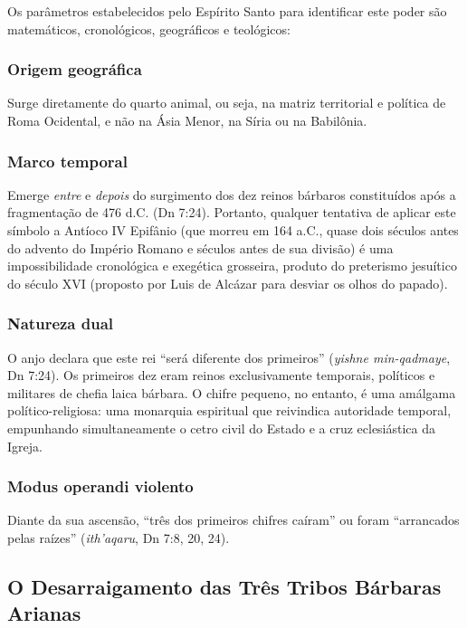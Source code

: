 Os parâmetros estabelecidos pelo Espírito Santo para identificar este poder são matemáticos, cronológicos, geográficos e teológicos:

\subsubsection*{Origem geográfica}
Surge diretamente do quarto animal, ou seja, na matriz territorial e política de Roma Ocidental, e não na Ásia Menor, na Síria ou na Babilônia.

\subsubsection*{Marco temporal}
Emerge \textit{entre} e \textit{depois} do surgimento dos dez reinos bárbaros constituídos após a fragmentação de 476 d.C. (Dn 7:24). Portanto, qualquer tentativa de aplicar este símbolo a Antíoco IV Epifânio (que morreu em 164 a.C., quase dois séculos antes do advento do Império Romano e séculos antes de sua divisão) é uma impossibilidade cronológica e exegética grosseira, produto do preterismo jesuítico do século XVI (proposto por Luis de Alcázar para desviar os olhos do papado).

\subsubsection*{Natureza dual}
O anjo declara que este rei ``será diferente dos primeiros'' (\textit{yishne min-qadmaye}, Dn 7:24). Os primeiros dez eram reinos exclusivamente temporais, políticos e militares de chefia laica bárbara. O chifre pequeno, no entanto, é uma amálgama político-religiosa: uma monarquia espiritual que reivindica autoridade temporal, empunhando simultaneamente o cetro civil do Estado e a cruz eclesiástica da Igreja.

\subsubsection*{Modus operandi violento}
Diante da sua ascensão, ``três dos primeiros chifres caíram'' ou foram ``arrancados pelas raízes'' (\textit{ith'aqaru}, Dn 7:8, 20, 24).



\subsection{O Desarraigamento das Três Tribos Bárbaras Arianas}


